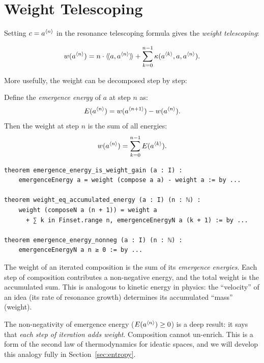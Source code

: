 \section{Weight Telescoping}

Setting $c = a^{\langle n \rangle}$ in the resonance telescoping formula gives the
\emph{weight telescoping}:

\begin{theorem}
\label{thm:weight-telescope}
\[
  w(a^{\langle n \rangle}) = n \cdot \langle\!\langle a, a^{\langle n \rangle} \rangle\!\rangle
  + \sum_{k=0}^{n-1} \kappa(a^{\langle k \rangle}, a, a^{\langle n \rangle}).
\]
\end{theorem}

More usefully, the weight can be decomposed step by step:

\begin{theorem}
\label{thm:energy-weight-gain}
Define the \emph{emergence energy} of $a$ at step $n$ as:
\[
  E(a^{\langle n \rangle}) = w(a^{\langle n+1 \rangle}) - w(a^{\langle n \rangle}).
\]
Then the weight at step $n$ is the sum of all energies:
\[
  w(a^{\langle n \rangle}) = \sum_{k=0}^{n-1} E(a^{\langle k \rangle}).
\]
\end{theorem}

\begin{lstlisting}[caption={Weight and energy (IDT\_v3\_Emergence.lean)}]
theorem emergence_energy_is_weight_gain (a : I) :
    emergenceEnergy a = weight (compose a a) - weight a := by ...

theorem weight_eq_accumulated_energy (a : I) (n : ℕ) :
    weight (composeN a (n + 1)) = weight a
      + ∑ k in Finset.range n, emergenceEnergyN a (k + 1) := by ...

theorem emergence_energy_nonneg (a : I) (n : ℕ) :
    emergenceEnergyN a n ≥ 0 := by ...
\end{lstlisting}

\begin{interpretation}
The weight of an iterated composition is the sum of its \emph{emergence energies}.
Each step of composition contributes a non-negative energy, and the total weight
is the accumulated sum. This is analogous to kinetic energy in physics: the
``velocity'' of an idea (its rate of resonance growth) determines its accumulated
``mass'' (weight).

The non-negativity of emergence energy ($E(a^{\langle n \rangle}) \geq 0$) is a
deep result: it says that \emph{each step of iteration adds weight}. Composition
cannot un-enrich. This is a form of the second law of thermodynamics for ideatic
spaces, and we will develop this analogy fully in Section~\ref{sec:entropy}.
\end{interpretation}


